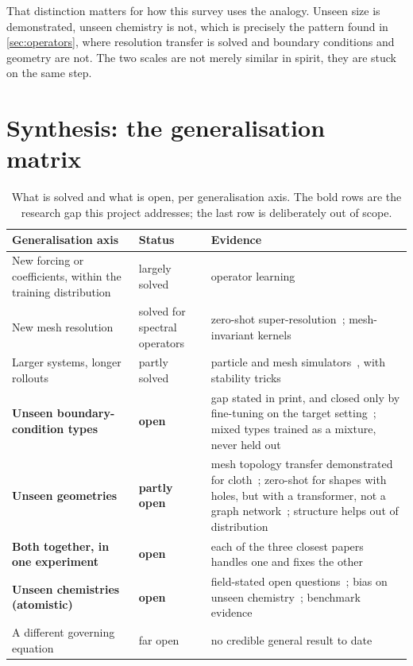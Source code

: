 \documentclass[11pt, a4paper]{article}
\begin{document}
That distinction matters for how this survey uses the analogy. Unseen size is
demonstrated, unseen chemistry is not, which is precisely the pattern found in
\cref{sec:operators}, where resolution transfer is solved and boundary
conditions and geometry are not. The two scales are not merely similar in
spirit, they are stuck on the same step.

\clearpage
\section{Synthesis: the generalisation matrix}
\label{sec:matrix}

\begin{table}[H]
  \centering
  \small
  \begin{tabular}{@{}L{4.6cm}lL{5.6cm}@{}}
    \toprule
    Generalisation axis & Status & Evidence \\
    \midrule
    New forcing or coefficients, within the training distribution &
    largely solved & operator learning~\citep{deeponet, fno} \\
    \addlinespace
    New mesh resolution &
    solved for spectral operators & zero-shot
    super-resolution~\citep{fno}; mesh-invariant kernels~\citep{gkn} \\
    \addlinespace
    Larger systems, longer rollouts &
    partly solved & particle and mesh simulators~\citep{sanchez2020,
    pfaff2020}, with stability tricks~\citep{brandstetter} \\
    \addlinespace
    \textbf{Unseen boundary-condition types} &
    \textbf{open} & gap stated in print, and closed only by fine-tuning on
    the target setting~\citep{bcextension}; mixed types trained as a
    mixture, never held out~\citep{brandstetter} \\
    \addlinespace
    \textbf{Unseen geometries} &
    \textbf{partly open} & mesh topology transfer demonstrated for
    cloth~\citep{pfaff2020}; zero-shot for shapes with holes, but with a
    transformer, not a graph network~\citep{domaindecomp}; structure helps
    out of distribution~\citep{structpreserving} \\
    \addlinespace
    \textbf{Both together, in one experiment} &
    \textbf{open} & each of the three closest papers handles one and fixes the
    other~\citep{bcextension, domaindecomp, brandstetter} \\
    \addlinespace
    \textbf{Unseen chemistries (atomistic)} &
    \textbf{open} & field-stated open questions~\citep{sixquestions};
    bias on unseen chemistry~\citep{mlipbias}; benchmark
    evidence~\citep{mliparena} \\
    \addlinespace
    A different governing equation &
    far open & no credible general result to date \\
    \bottomrule
  \end{tabular}
  \caption{What is solved and what is open, per generalisation axis. The
  bold rows are the research gap this project addresses; the last row is
  deliberately out of scope.}
  \label{tab:matrix}
\end{table}
\end{document}
